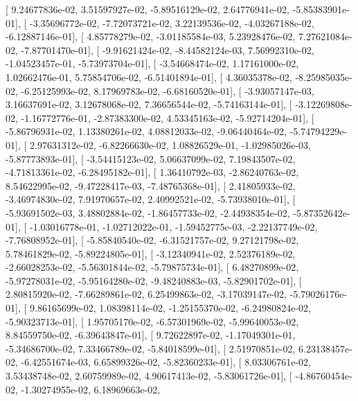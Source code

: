 \documentclass{article}
\begin{document}
       [  9.24677836e-02,   3.51597927e-02,  -5.89516129e-02,
          2.64776941e-02,  -5.85383901e-01],
       [ -3.35696772e-02,  -7.72073721e-02,   3.22139536e-02,
         -4.03267188e-02,  -6.12887146e-01],
       [  4.85778279e-02,  -3.01185584e-03,   5.23928476e-02,
          7.27621084e-02,  -7.87701470e-01],
       [ -9.91621424e-02,  -8.44582124e-03,   7.56992310e-02,
         -1.04523457e-01,  -5.73973704e-01],
       [ -3.54668474e-02,   1.17161000e-02,   1.02662476e-01,
          5.75854706e-02,  -6.51401894e-01],
       [  4.36035378e-02,  -8.25985035e-02,  -6.25125993e-02,
          8.17969783e-02,  -6.68160520e-01],
       [ -3.93057147e-03,   3.16637691e-02,   3.12678068e-02,
          7.36656544e-02,  -5.74163144e-01],
       [ -3.12269808e-02,  -1.16772776e-01,  -2.87383300e-02,
          4.53345163e-02,  -5.92714204e-01],
       [ -5.86796931e-02,   1.13380261e-02,   4.08812033e-02,
         -9.06440464e-02,  -5.74794229e-01],
       [  2.97631312e-02,  -6.82266630e-02,   1.08826529e-01,
         -1.02985026e-03,  -5.87773893e-01],
       [ -3.54415123e-02,   5.06637099e-02,   7.19843507e-02,
         -4.71813361e-02,  -6.28495182e-01],
       [  1.36410792e-03,  -2.86240763e-02,   8.54622995e-02,
         -9.47228417e-03,  -7.48765368e-01],
       [  2.41805933e-02,  -3.46974830e-02,   7.91970657e-02,
          2.40992521e-02,  -5.73938010e-01],
       [ -5.93691502e-03,   3.48802884e-02,  -1.86457733e-02,
         -2.44938354e-02,  -5.87352642e-01],
       [ -1.03016778e-01,  -1.02712022e-01,  -1.59452775e-03,
         -2.22137749e-02,  -7.76808952e-01],
       [ -5.85840540e-02,  -6.31521757e-02,   9.27121798e-02,
          5.78461829e-02,  -5.89224805e-01],
       [ -3.12340941e-02,   2.52376189e-02,  -2.66028253e-02,
         -5.56301844e-02,  -5.79875734e-01],
       [  6.48270899e-02,  -5.97278031e-02,  -5.95164280e-02,
         -9.48240883e-03,  -5.82901702e-01],
       [  2.80815920e-02,  -7.66289861e-02,   6.25499863e-02,
         -3.17039147e-02,  -5.79026176e-01],
       [  9.86165699e-02,   1.08398114e-02,  -1.25155370e-02,
         -6.24980824e-02,  -5.90323713e-01],
       [  1.95705170e-02,  -6.57301969e-02,  -5.99640053e-02,
          8.84559750e-02,  -6.39643847e-01],
       [  9.72622897e-02,  -1.17049301e-01,  -5.34686700e-02,
          7.33466789e-02,  -5.84018599e-01],
       [  2.51970851e-02,   6.23138457e-02,  -6.42551674e-03,
          6.65899326e-02,  -5.82360233e-01],
       [  8.03306761e-02,   3.53438748e-02,   2.60759989e-02,
          4.90617413e-02,  -5.83061726e-01],
       [ -4.86760454e-02,  -1.30274955e-02,   6.18969663e-02,
\end{document}
